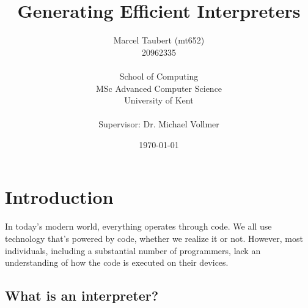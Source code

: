 \documentclass{article}
\title{Generating Efficient Interpreters}
\author{
    Marcel Taubert  (mt652)\\
    20962335        \\
    \\
    School of Computing \\
    MSc Advanced Computer Science\\
    University of Kent \\
    \\
    Supervisor: Dr. Michael Vollmer
}
\date{\today}
\begin{document}
\maketitle
\clearpage
\tableofcontents
\section{Introduction}



In today's modern world, everything operates through code. We all use
technology that's powered by code, whether we realize it or not. However, most
individuals, including a substantial number of programmers, lack an
understanding of how the code is executed on their devices.

\subsection{What is an interpreter?}
\end{document}

